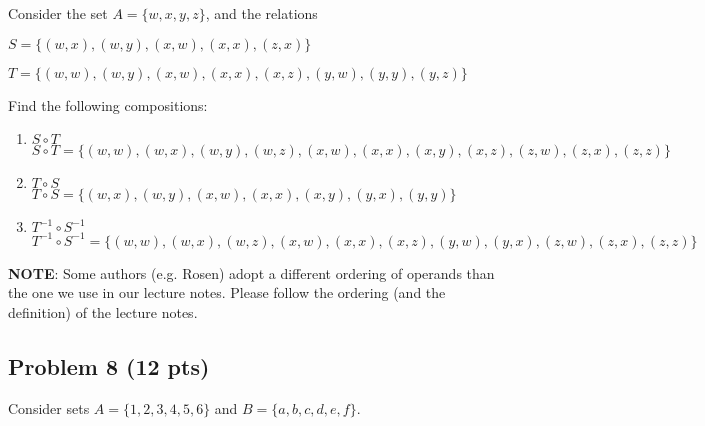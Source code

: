 \documentclass[12pt]{article}
\begin{document}
Consider the set $A = \{ w, x, y, z \}$, and the relations

\begin{description}

\item $S = \{ (w, x), (w, y), (x, w), (x, x), (z, x) \}$

\item $T = \{ (w, w), (w, y), (x, w), (x, x),  (x, z), (y, w), (y, y), (y, z) \}$
\end{description}

\noindent Find the following compositions:

\begin{enumerate}
\item $S \circ T$\\
$S \circ T = \{ (w, w), (w, x), (w, y), (w, z), (x, w), (x, x), (x, y), (x, z), (z, w), (z, x), (z, z) \}$\\

\item $T \circ S$\\
$T \circ S = \{ (w, x), (w, y), (x, w), (x, x), (x, y), (y, x) , (y, y) \}$\\

\item $T^{-1} \circ S^{-1}$\\
$T^{-1} \circ S^{-1} = \{ (w, w), (w, x), (w, z), (x, w), (x, x), (x, z), (y, w), (y, x), (z, w), (z, x), (z, z) \}$\\
\end{enumerate}

\noindent \textbf{NOTE}: Some authors (e.g. Rosen) adopt a different ordering of operands than the one we use in our lecture notes. Please follow the ordering (and the definition) of the lecture notes.

\newpage


\subsection{Problem 8 (12 pts)}

Consider sets $A = \{1, 2, 3, 4, 5, 6 \}$ and $B = \{ a, b, c, d, e, f \}$.
\end{document}
